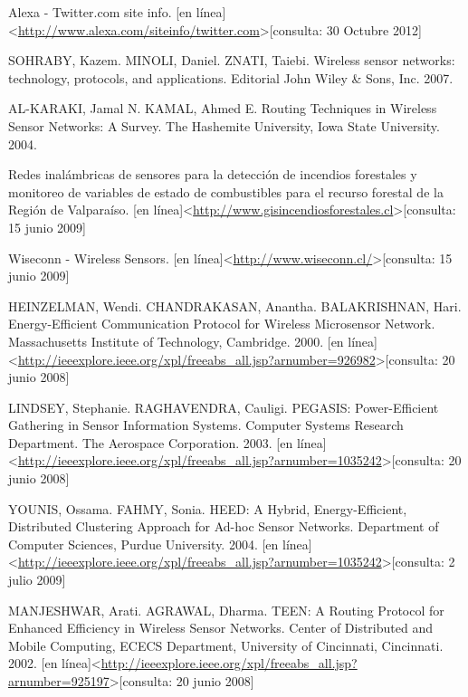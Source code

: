 
\begin{thebibliography}{99}
\begin{sloppypar}

Alexa - Twitter.com site info. [en línea]\textless \url{http://www.alexa.com/siteinfo/twitter.com}\textgreater[consulta: 30 Octubre 2012] 


 SOHRABY, Kazem. MINOLI, Daniel. ZNATI, Taiebi. Wireless sensor networks: technology, protocols, and applications. Editorial John Wiley \& Sons, Inc. 2007.

 AL-KARAKI, Jamal N. KAMAL, Ahmed E. Routing Techniques in Wireless Sensor Networks: A Survey. The Hashemite University, Iowa State University. 2004.

 Redes inalámbricas de sensores para la detección de incendios forestales y monitoreo de variables de estado de combustibles para el recurso forestal de la Región de Valparaíso. [en línea]\textless \url{http://www.gisincendiosforestales.cl}\textgreater[consulta: 15 junio 2009] 

 Wiseconn - Wireless Sensors. [en línea]\textless \url{http://www.wiseconn.cl/}\textgreater[consulta: 15 junio 2009] 

 HEINZELMAN, Wendi. CHANDRAKASAN, Anantha. BALAKRISHNAN, Hari. Energy-Efficient Communication Protocol for Wireless  Microsensor Network. Massachusetts Institute of Technology, Cambridge. 2000. [en línea]\textless \url{http://ieeexplore.ieee.org/xpl/freeabs_all.jsp?arnumber=926982}\textgreater[consulta: 20 junio 2008] 

 LINDSEY, Stephanie. RAGHAVENDRA, Cauligi. PEGASIS: Power-Efficient Gathering in Sensor Information Systems. Computer Systems Research Department. The Aerospace Corporation. 2003. [en línea]\textless \url{http://ieeexplore.ieee.org/xpl/freeabs_all.jsp?arnumber=1035242}\textgreater[consulta: 20 junio 2008] 

 YOUNIS, Ossama. FAHMY, Sonia. HEED: A Hybrid, Energy-Efficient, Distributed Clustering Approach for Ad-hoc Sensor Networks. Department of Computer Sciences, Purdue University. 2004. [en línea]\textless \url{http://ieeexplore.ieee.org/xpl/freeabs_all.jsp?arnumber=1035242}\textgreater[consulta:  2 julio 2009] 

 MANJESHWAR, Arati. AGRAWAL, Dharma. TEEN: A Routing Protocol for Enhanced Efficiency in Wireless Sensor Networks. Center of Distributed and Mobile Computing, ECECS Department, University of Cincinnati, Cincinnati. 2002. [en línea]\textless \url{http://ieeexplore.ieee.org/xpl/freeabs_all.jsp?arnumber=925197}\textgreater[consulta: 20 junio 2008] 


\end{sloppypar}
\end{thebibliography}
